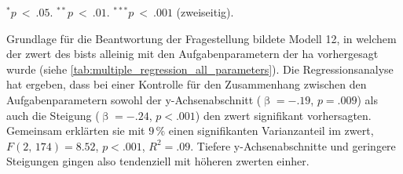 \documentclass[11pt, twoside, a4paper]{book}		%
\begin{document}
\begin{table}[htbp]
\begin{adjustbox}{width=1\textwidth}
\begin{threeparttable}
			\begin{tablenotes}[flushleft]
				\footnotesize				%
				\setlength{}	%
				\item $^{*}p~<~.05$. $^{**}p~<~.01$. $^{***}p~<~.001$ (zweiseitig).
			\end{tablenotes}
		\end{threeparttable}
	\end{adjustbox}
\end{table}



Grundlage für die Beantwortung der Fragestellung bildete Modell 12, in welchem der \gls{zwert} des \gls{bist}s alleinig mit den Aufgabenparametern der \gls{ha} vorhergesagt wurde (siehe \autoref{tab:multiple_regression_all_parameters}).
Die Regressionsanalyse hat ergeben, dass bei einer Kontrolle für den Zusammenhang zwischen den Aufgabenparametern sowohl der y-Achsenabschnitt ($\upbeta=-.19$, $p=.009$) als auch die Steigung ($\upbeta=-.24$, $p<.001$) den \gls{zwert} signifikant vorhersagten. Gemeinsam erklärten sie mit $9\,\%$ einen signifikanten Varianzanteil im \gls{zwert}, $F(2,\,174)=8.52$, $p<.001$, $R^2=.09$. Tiefere y-Achsenabschnitte und geringere Steigungen gingen also tendenziell mit höheren \gls{zwert}en einher.

\end{document}
